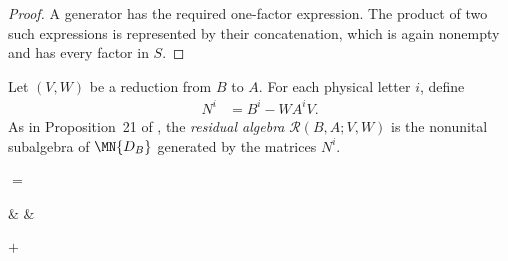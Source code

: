 \begin{proof}
    \leanok
    A generator has the required one-factor expression.  The product of two
    such expressions is represented by their concatenation, which is again
    nonempty and has every factor in $S$.
\end{proof}


\begin{definition}
    \label{def:mps_reduction_residual_algebra}
    \leanok
    Let $(V,W)$ be a reduction from $B$ to $A$.  For each physical letter
    $i$, define
    \begin{align}
        N^i & = B^i-WA^iV.
        \label{eq:mps_reduction_residual_letter}
    \end{align}
    As in Proposition~21 of \cite{Molnar2018SemiInjective}, the
    \emph{residual algebra} $\mathcal R(B,A;V,W)$ is the nonunital
    subalgebra of $\MN{D_B}$ generated by the matrices $N^i$.
\end{definition}

\begin{center}
    \tenkzkernel
    \begin{tenkz}[rows={wire}, cols=1, west=open, east=open]
    \end{tenkz}
    \quad $=$ \quad
    \begin{tenkz}[rows={wire}, cols=3, west=open, east=open]
         &
         &
    \end{tenkz}
    \quad $+$ \quad
    \begin{tenkz}[rows={wire}, cols=1, west=open, east=open]
    \end{tenkz}
\end{center}


